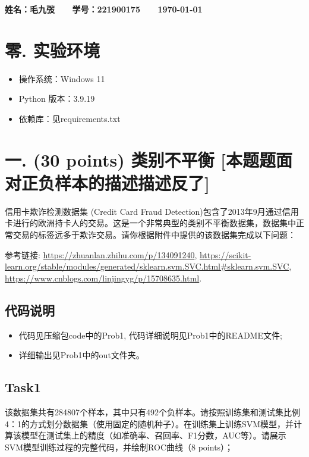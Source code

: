 \documentclass[8pt]{article}
\begin{document}
\textbf{\color{blue} \Large 姓名：毛九弢 \ \ \ 学号：221900175 \ \ \ \today}

\section*{零. 实验环境}
\begin{itemize}
    \item 操作系统：Windows 11
    \item Python 版本：3.9.19
    \item 依赖库：见requirements.txt
\end{itemize}

\section*{一. (30 points) 类别不平衡 [本题题面对正负样本的描述描述反了]}

信用卡欺诈检测数据集 (Credit Card Fraud Detection)包含了2013年9月通过信用卡进行的欧洲持卡人的交易。这是一个非常典型的类别不平衡数据集，数据集中正常交易的标签远多于欺诈交易。请你根据附件中提供的该数据集完成以下问题：

参考链接: 
\url{https://zhuanlan.zhihu.com/p/134091240},
\url{https://scikit-learn.org/stable/modules/generated/sklearn.svm.SVC.html#sklearn.svm.SVC},
\url{https://www.cnblogs.com/linjingyg/p/15708635.html}.

\subsection*{代码说明}
\begin{itemize}
    \item 代码见压缩包code中的Prob1, 代码详细说明见Prob1中的README文件; 
    \item 详细输出见Prob1中的out文件夹。
\end{itemize}

\subsection*{Task1}
该数据集共有284807个样本，其中只有492个负样本。请按照训练集和测试集比例4：1的方式划分数据集（使用固定的随机种子）。在训练集上训练SVM模型，并计算该模型在测试集上的精度（如准确率、召回率、F1分数，AUC等）。请展示SVM模型训练过程的完整代码，并绘制ROC曲线（8 points）；
\end{document}
